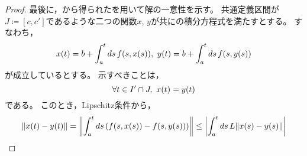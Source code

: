\documentclass[b5paper,draft,oneside,openany]{ltjsbook} %
\begin{document}
\begin{thm}[Picardの定理]
\begin{proof}
        最後に，から得られたを用いて解の一意性を示す。
        共通定義区間が$J\coloneqq[c,c']$であるような二つの関数$x$, $y$が共にの積分方程式を満たすとする。
        すなわち，
        \begin{equation}
            \fun{x}{t}=b+\int_a^t ds\,\fun{f}{s,\fun{x}{s}},
            \
            \fun{y}{t}=b+\int_a^t ds\,\fun{f}{s,\fun{y}{s}}
        \end{equation}
        が成立しているとする。
        示すべきことは，
        \begin{equation}
            \forall t\in I'\cap J,\ \fun{x}{t}=\fun{y}{t}
        \end{equation}
        である。
        このとき，Lipschitz条件から，
        \begin{equation}
            \norm{\fun{x}{t}-\fun{y}{t}}=\norm{\int_a^tds\,\pare{\fun{f}{s,\fun{x}{s}}-\fun{f}{s,\fun{y}{s}}}}
            \leq \abs{\int_a^tds\,L\norm{\fun{x}{s}-\fun{y}{s}}}
        \end{equation}
    \end{proof}
\end{thm}
\end{document}
